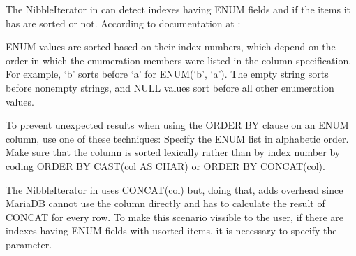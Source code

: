 \documentclass[letterpaper,10pt,english]{sphinxmanual}
\begin{document}
\begin{fulllineitems}
\label{\detokenize{mariadb-schema-change:cmdoption-mariadb-schema-change-force-concat-enums}}
\sphinxAtStartPar
The NibbleIterator in  can detect indexes having ENUM fields and
if the items it has are sorted or not. According to documentation at
:

\sphinxAtStartPar
ENUM values are sorted based on their index numbers, which depend on the order in
which the enumeration members were listed in the column specification.
For example, ‘b’ sorts before ‘a’ for ENUM(‘b’, ‘a’).
The empty string sorts before nonempty strings, and NULL values sort before all other
enumeration values.

\sphinxAtStartPar
To prevent unexpected results when using the ORDER BY clause on an ENUM column,
use one of these techniques:
\sphinxhyphen{} Specify the ENUM list in alphabetic order.
\sphinxhyphen{} Make sure that the column is sorted lexically rather than by index number by coding
ORDER BY CAST(col AS CHAR) or ORDER BY CONCAT(col).

\sphinxAtStartPar
The NibbleIterator in  uses CONCAT(col) but, doing that, adds overhead
since MariaDB cannot use the column directly and has to calculate the result of CONCAT
for every row.
To make this scenario vissible to the user, if there are indexes having ENUM fields
with usorted items, it is necessary to specify the  parameter.

\end{fulllineitems}

\end{document}
